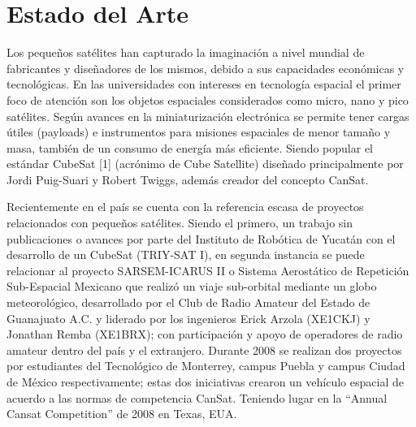 
\chapter{Estado del Arte} %



Los peque\~{n}os sat\'{e}lites han capturado la imaginaci\'{o}n a nivel mundial de fabricantes y dise\~{n}adores de los mismos, debido a sus capacidades econ\'{o}micas y tecnol\'{o}gicas. En las universidades con intereses en tecnolog\'{i}a espacial el primer foco de atenci\'{o}n son los objetos espaciales considerados como micro, nano y pico sat\'{e}lites. Seg\'{u}n avances en la miniaturizaci\'{o}n electr\'{o}nica se permite tener cargas \'{u}tiles (payloads) e instrumentos para misiones espaciales de menor tama\~{n}o y masa, tambi\'{e}n de un consumo de energ\'{i}a m\'{a}s eficiente. Siendo popular el est\'{a}ndar CubeSat [1] (acr\'{o}nimo de Cube Satellite) dise\~{n}ado principalmente por Jordi Puig-Suari y Robert Twiggs, adem\'{a}s creador del concepto CanSat.


Recientemente en el pa\'{i}s se cuenta con la referencia escasa de proyectos relacionados con peque\~{n}os sat\'{e}lites. Siendo el primero, un trabajo sin publicaciones o avances por parte del Instituto de Rob\'{o}tica de Yucat\'{a}n con el desarrollo de un CubeSat (TRIY-SAT I), en segunda instancia se puede relacionar al proyecto SARSEM-ICARUS II o Sistema Aerost\'{a}tico de Repetici\'{o}n Sub-Espacial Mexicano que realiz\'{o} un viaje sub-orbital mediante un globo meteorol\'{o}gico, desarrollado por el Club de Radio Amateur del Estado de Guanajuato A.C. y liderado por los ingenieros Erick Arzola (XE1CKJ) y Jonathan Remba (XE1BRX); con participaci\'{o}n y apoyo de operadores de radio amateur dentro del pa\'{i}s y el extranjero. Durante 2008 se realizan dos proyectos por estudiantes del Tecnol\'{o}gico de Monterrey, campus Puebla y campus Ciudad de M\'{e}xico respectivamente; estas dos iniciativas crearon un veh\'{i}culo espacial de acuerdo a las normas de competencia CanSat. Teniendo lugar en la “Annual Cansat Competition” de 2008 en Texas, EUA.





